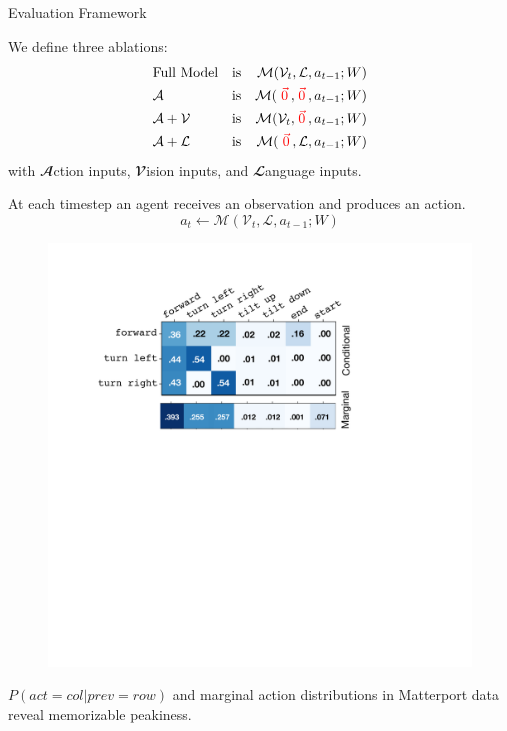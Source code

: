 \documentclass[final]{beamer}
\newcommand{\mmodel}{\mathcal{M}}
\newcommand{\mvisionin}{\mathcal{V}}
\newcommand{\mlanguagein}{\mathcal{L}}
\newcommand{\mhistoryin}{a}
\newcommand{\mzero}{\textcolor{red}{\vec{0}}}
\newcommand{\setblocksize}{\LARGE \centering}
\newcommand{\paragraphbreak}{\vspace{1cm}}
\begin{document}
\begin{frame}{}
\begin{columns}[t]
\begin{column}{.24\linewidth}
\begin{block}{\setblocksize Evaluation Framework}
{We define three ablations:
\vspace{-10pt}
\begin{align*}
    &\text{Full Model} & \mathrm{is} && \mmodel(\mvisionin_t, \mlanguagein, \mhistoryin_{t-1}; W) \\
    &\mathcal{A} & \mathrm{is} && \mmodel(\hspace{3pt}\mzero\hspace{2pt},\hspace{1pt} \mzero\hspace{2pt}, \mhistoryin_{t-1}; W) \\
    &\mathcal{A+V} & \mathrm{is}& & \mmodel(\mvisionin_t,\hspace{1pt} \mzero\hspace{2pt}, \mhistoryin_{t-1}; W)\\
    &\mathcal{A+L} & \mathrm{is}& & \mmodel(\hspace{3pt}\mzero\hspace{2pt}, \mlanguagein, \mhistoryin_{t-1}; W)
\end{align*}
with $\mathbfcal{A}$ction inputs, $\mathbfcal{V}$ision inputs, and $\mathbfcal{L}$anguage inputs.

At each timestep an agent receives an observation and produces an action.
\begin{equation}
    a_t \leftarrow \mmodel(\mvisionin_t, \mlanguagein, \mhistoryin_{t-1}; W)
\end{equation} 
\paragraphbreak

\begin{figure}[t]
\includegraphics[width=\columnwidth]{figures/matterport_actions_squeeze_top_big.pdf}
\centering
\end{figure}
$P(act=col | prev=row)$ and marginal action distributions in Matterport data reveal memorizable peakiness.
\paragraphbreak

}
\end{block}
\end{column}
\end{columns}
\end{frame}
\end{document}
